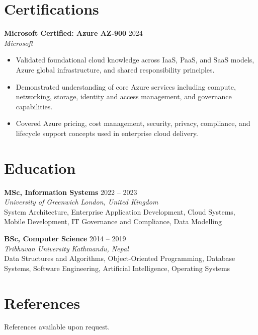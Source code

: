 \documentclass[10pt,a4paper]{article}
\begin{document}
\newpage

\section*{Certifications}
\textbf{Microsoft Certified: Azure AZ-900} \hfill 2024\\
\textit{Microsoft}\\
\begin{itemize}
	\item Validated foundational cloud knowledge across IaaS, PaaS, and SaaS models, Azure global infrastructure, and shared responsibility principles.
	\item Demonstrated understanding of core Azure services including compute, networking, storage, identity and access management, and governance capabilities.
	\item Covered Azure pricing, cost management, security, privacy, compliance, and lifecycle support concepts used in enterprise cloud delivery.
\end{itemize}

\section*{Education}
\textbf{MSc, Information Systems} \hfill 2022 -- 2023\\
\textit{University of Greenwich} \hfill \textit{London, United Kingdom}\\
\vspace{0.15em}
System Architecture, Enterprise Application Development, Cloud Systems, Mobile Development, IT Governance and Compliance, Data Modelling

\vspace{0.5em}

\textbf{BSc, Computer Science} \hfill 2014 -- 2019\\
\textit{Tribhuvan University} \hfill \textit{Kathmandu, Nepal}\\
\vspace{0.15em}
Data Structures and Algorithms, Object-Oriented Programming, Database Systems, Software Engineering, Artificial Intelligence, Operating Systems

\section*{References}
References available upon request.
\end{document}
